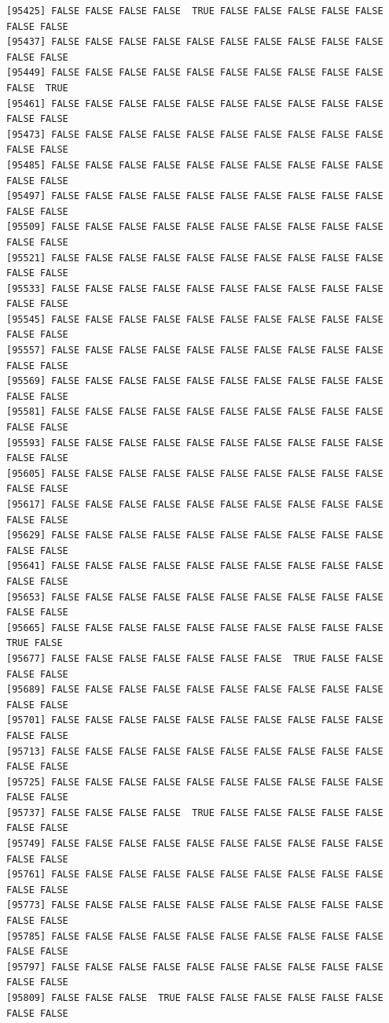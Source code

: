 \documentclass[
  a4paper,
  DIV=11,
  numbers=noendperiod]{scrartcl}
\begin{document}
\begin{verbatim}
[95425] FALSE FALSE FALSE FALSE  TRUE FALSE FALSE FALSE FALSE FALSE FALSE FALSE
[95437] FALSE FALSE FALSE FALSE FALSE FALSE FALSE FALSE FALSE FALSE FALSE FALSE
[95449] FALSE FALSE FALSE FALSE FALSE FALSE FALSE FALSE FALSE FALSE FALSE  TRUE
[95461] FALSE FALSE FALSE FALSE FALSE FALSE FALSE FALSE FALSE FALSE FALSE FALSE
[95473] FALSE FALSE FALSE FALSE FALSE FALSE FALSE FALSE FALSE FALSE FALSE FALSE
[95485] FALSE FALSE FALSE FALSE FALSE FALSE FALSE FALSE FALSE FALSE FALSE FALSE
[95497] FALSE FALSE FALSE FALSE FALSE FALSE FALSE FALSE FALSE FALSE FALSE FALSE
[95509] FALSE FALSE FALSE FALSE FALSE FALSE FALSE FALSE FALSE FALSE FALSE FALSE
[95521] FALSE FALSE FALSE FALSE FALSE FALSE FALSE FALSE FALSE FALSE FALSE FALSE
[95533] FALSE FALSE FALSE FALSE FALSE FALSE FALSE FALSE FALSE FALSE FALSE FALSE
[95545] FALSE FALSE FALSE FALSE FALSE FALSE FALSE FALSE FALSE FALSE FALSE FALSE
[95557] FALSE FALSE FALSE FALSE FALSE FALSE FALSE FALSE FALSE FALSE FALSE FALSE
[95569] FALSE FALSE FALSE FALSE FALSE FALSE FALSE FALSE FALSE FALSE FALSE FALSE
[95581] FALSE FALSE FALSE FALSE FALSE FALSE FALSE FALSE FALSE FALSE FALSE FALSE
[95593] FALSE FALSE FALSE FALSE FALSE FALSE FALSE FALSE FALSE FALSE FALSE FALSE
[95605] FALSE FALSE FALSE FALSE FALSE FALSE FALSE FALSE FALSE FALSE FALSE FALSE
[95617] FALSE FALSE FALSE FALSE FALSE FALSE FALSE FALSE FALSE FALSE FALSE FALSE
[95629] FALSE FALSE FALSE FALSE FALSE FALSE FALSE FALSE FALSE FALSE FALSE FALSE
[95641] FALSE FALSE FALSE FALSE FALSE FALSE FALSE FALSE FALSE FALSE FALSE FALSE
[95653] FALSE FALSE FALSE FALSE FALSE FALSE FALSE FALSE FALSE FALSE FALSE FALSE
[95665] FALSE FALSE FALSE FALSE FALSE FALSE FALSE FALSE FALSE FALSE  TRUE FALSE
[95677] FALSE FALSE FALSE FALSE FALSE FALSE FALSE  TRUE FALSE FALSE FALSE FALSE
[95689] FALSE FALSE FALSE FALSE FALSE FALSE FALSE FALSE FALSE FALSE FALSE FALSE
[95701] FALSE FALSE FALSE FALSE FALSE FALSE FALSE FALSE FALSE FALSE FALSE FALSE
[95713] FALSE FALSE FALSE FALSE FALSE FALSE FALSE FALSE FALSE FALSE FALSE FALSE
[95725] FALSE FALSE FALSE FALSE FALSE FALSE FALSE FALSE FALSE FALSE FALSE FALSE
[95737] FALSE FALSE FALSE FALSE  TRUE FALSE FALSE FALSE FALSE FALSE FALSE FALSE
[95749] FALSE FALSE FALSE FALSE FALSE FALSE FALSE FALSE FALSE FALSE FALSE FALSE
[95761] FALSE FALSE FALSE FALSE FALSE FALSE FALSE FALSE FALSE FALSE FALSE FALSE
[95773] FALSE FALSE FALSE FALSE FALSE FALSE FALSE FALSE FALSE FALSE FALSE FALSE
[95785] FALSE FALSE FALSE FALSE FALSE FALSE FALSE FALSE FALSE FALSE FALSE FALSE
[95797] FALSE FALSE FALSE FALSE FALSE FALSE FALSE FALSE FALSE FALSE FALSE FALSE
[95809] FALSE FALSE FALSE  TRUE FALSE FALSE FALSE FALSE FALSE FALSE FALSE FALSE

\end{verbatim}
\end{document}
